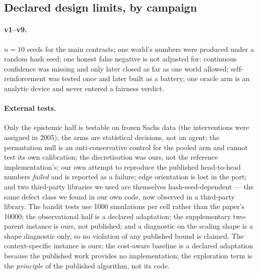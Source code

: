 \documentclass[11pt]{article}
\begin{document}
\subsection{Declared design limits, by campaign}

\paragraph{v1--v9.} $n = 10$ seeds for the main contrasts; one world's numbers were
produced under a random hash seed; one honest false negative is not adjusted for;
continuous confidence was missing and only later closed as far as one world allowed;
self-reinforcement was tested once and later built as a battery; one oracle arm is an
analytic device and never entered a fairness verdict.

\paragraph{External tests.} Only the epistemic half is testable on frozen Sachs data
(the interventions were assigned in 2005); the arms are statistical decisions, not an
agent; the permutation null is an anti-conservative control for the pooled arm and
cannot test its own calibration; the discretisation was ours, not the reference
implementation's; our own attempt to reproduce the published head-to-head numbers
\emph{failed} and is reported as a failure; edge orientation is lost in the port; and
two third-party libraries we used are themselves hash-seed-dependent --- the same
defect class we found in our own code, now observed in a third-party library. The
bandit tests use 1000 simulations per cell rather than the paper's 10000; the
observational half is a declared adaptation; the supplementary two-parent instance is
ours, not published; and a diagnostic on the scaling shape is a shape diagnostic only,
so no violation of any published bound is claimed. The context-specific instance is
ours; the cost-aware baseline is a declared adaptation because the published work
provides no implementation; the exploration term is the \emph{principle} of the
published algorithm, not its code.
\end{document}

